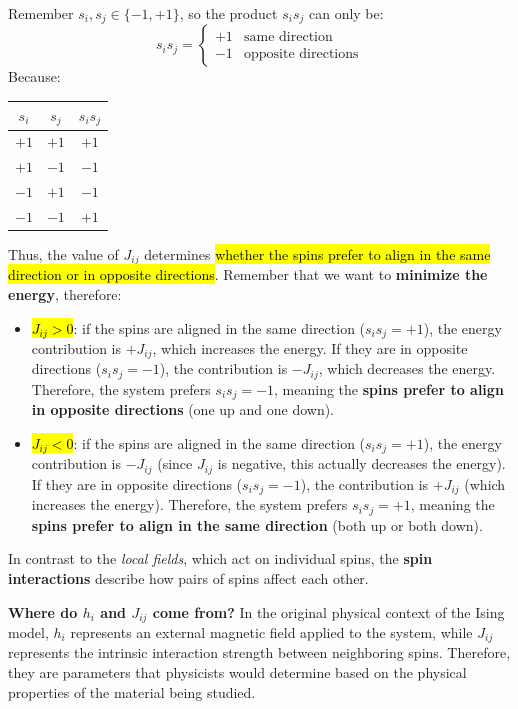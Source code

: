 \begin{itemize}
\begin{itemize}
        Remember $s_{i}, s_{j} \in \{-1, +1\}$, so the product $s_i s_j$ can only be:
        \begin{equation*}
            s_i s_j = \begin{cases}
                +1 & \text{same direction} \\
                -1 & \text{opposite directions}
            \end{cases}
        \end{equation*}
        Because:
        \begin{center}
            \begin{tabular}{@{} c c c @{}}
                \toprule
                $s_i$ & $s_j$ & $s_i s_j$ \\
                \midrule
                $+1$ & $+1$ & $+1$ \\
                $+1$ & $-1$ & $-1$ \\
                $-1$ & $+1$ & $-1$ \\
                $-1$ & $-1$ & $+1$ \\
                \bottomrule
            \end{tabular}
        \end{center}
        Thus, the value of $J_{ij}$ determines \hl{whether the spins prefer to align in the same direction or in opposite directions}. Remember that we want to \textbf{minimize the energy}, therefore:
        \begin{itemize}
            \item \hl{$J_{ij} > 0$}: if the spins are aligned in the same direction ($s_i s_j = +1$), the energy contribution is $+J_{ij}$, which increases the energy. If they are in opposite directions ($s_i s_j = -1$), the contribution is $-J_{ij}$, which decreases the energy. Therefore, the system prefers $s_i s_j = -1$, meaning the \textbf{spins prefer to align in opposite directions} (one up and one down).
            \item \hl{$J_{ij} < 0$}: if the spins are aligned in the same direction ($s_i s_j = +1$), the energy contribution is $-J_{ij}$ (since $J_{ij}$ is negative, this actually decreases the energy). If they are in opposite directions ($s_i s_j = -1$), the contribution is $+J_{ij}$ (which increases the energy). Therefore, the system prefers $s_i s_j = +1$, meaning the \textbf{spins prefer to align in the same direction} (both up or both down).
        \end{itemize}
    \end{itemize}

    In contrast to the \emph{local fields}, which act on individual spins, the \textbf{spin interactions} describe how pairs of spins affect each other.
\end{itemize}
\textcolor{Green3}{ \textbf{Where do $h_i$ and $J_{ij}$ come from?}} In the original physical context of the Ising model, $h_i$ represents an external magnetic field applied to the system, while $J_{ij}$ represents the intrinsic interaction strength between neighboring spins. Therefore, they are parameters that physicists would determine based on the physical properties of the material being studied.

